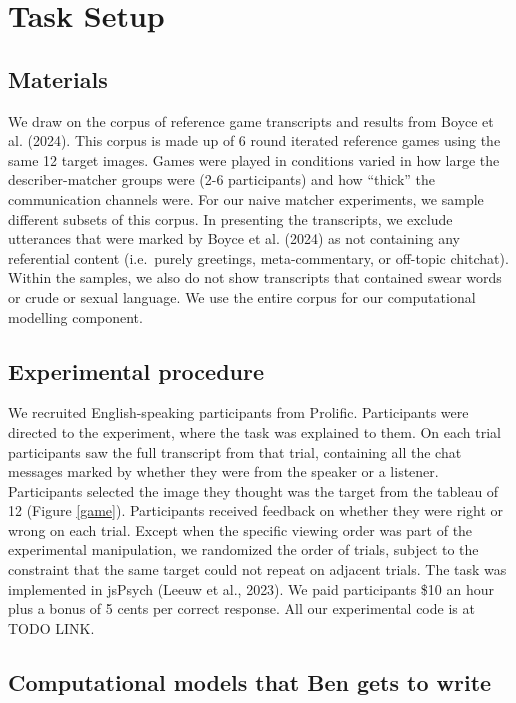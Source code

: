 \documentclass[10pt, letterpaper]{article}
\begin{document}
\section{Task Setup}\label{task-setup}

\subsection{Materials}\label{materials}

We draw on the corpus of reference game transcripts and results from
Boyce et al. (2024). This corpus is made up of 6 round iterated
reference games using the same 12 target images. Games were played in
conditions varied in how large the describer-matcher groups were (2-6
participants) and how ``thick'' the communication channels were. For our
naive matcher experiments, we sample different subsets of this corpus.
In presenting the transcripts, we exclude utterances that were marked by
Boyce et al. (2024) as not containing any referential content
(i.e.~purely greetings, meta-commentary, or off-topic chitchat). Within
the samples, we also do not show transcripts that contained swear words
or crude or sexual language. We use the entire corpus for our
computational modelling component.

\subsection{Experimental procedure}\label{experimental-procedure}

We recruited English-speaking participants from Prolific. Participants
were directed to the experiment, where the task was explained to them.
On each trial participants saw the full transcript from that trial,
containing all the chat messages marked by whether they were from the
speaker or a listener. Participants selected the image they thought was
the target from the tableau of 12 (Figure \ref{game}). Participants
received feedback on whether they were right or wrong on each trial.
Except when the specific viewing order was part of the experimental
manipulation, we randomized the order of trials, subject to the
constraint that the same target could not repeat on adjacent trials. The
task was implemented in jsPsych (Leeuw et al., 2023). We paid
participants \$10 an hour plus a bonus of 5 cents per correct response.
All our experimental code is at TODO LINK.

\subsection{Computational models that Ben gets to
write}\label{computational-models-that-ben-gets-to-write}
\end{document}
